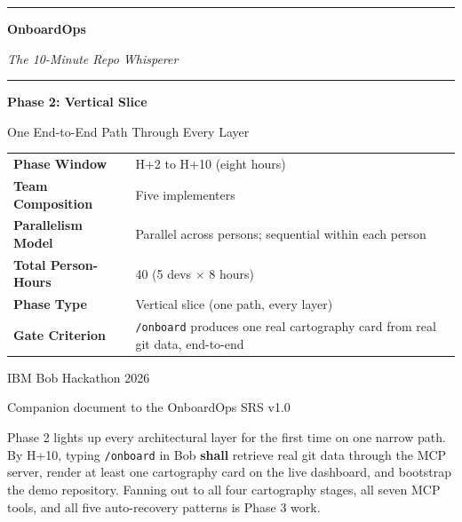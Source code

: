 \documentclass[11pt,letterpaper]{article}
\newcommand{\shall}{\textbf{shall}}
\begin{document}

\begin{titlepage}
\thispagestyle{empty}
\centering
\vspace*{1.5cm}

{\color{ibmblue}\rule{\textwidth}{2pt}}
\vspace{0.8cm}

{\fontsize{38}{46}\selectfont\bfseries\color{ibmblue} OnboardOps\par}
\vspace{0.3cm}
{\Large\itshape\color{ibmgray} The 10-Minute Repo Whisperer\par}
\vspace{0.4cm}

{\color{ibmblue}\rule{\textwidth}{2pt}}
\vspace{2.0cm}

{\huge\bfseries Phase 2: Vertical Slice\par}
\vspace{0.3cm}
{\large One End-to-End Path Through Every Layer\par}
\vspace{2.5cm}

\begin{tabularx}{0.75\textwidth}{lX}
\toprule
\textbf{Phase Window} & H+2 to H+10 (eight hours) \\
\textbf{Team Composition} & Five implementers \\
\textbf{Parallelism Model} & Parallel across persons; sequential within each person \\
\textbf{Total Person-Hours} & 40 (5 devs $\times$ 8 hours) \\
\textbf{Phase Type} & Vertical slice (one path, every layer) \\
\textbf{Gate Criterion} & \texttt{/onboard} produces one real cartography card from real git data, end-to-end \\
\bottomrule
\end{tabularx}

\vfill

{\large IBM Bob Hackathon 2026\par}
{\normalsize Companion document to the OnboardOps SRS v1.0\par}
\vspace{0.6cm}
{\small\color{ibmgray} Phase 2 lights up every architectural layer for the first time on one narrow path. By H+10, typing \texttt{/onboard} in Bob \shall{} retrieve real git data through the MCP server, render at least one cartography card on the live dashboard, and bootstrap the demo repository. Fanning out to all four cartography stages, all seven MCP tools, and all five auto-recovery patterns is Phase 3 work.\par}
\end{titlepage}
\end{document}
